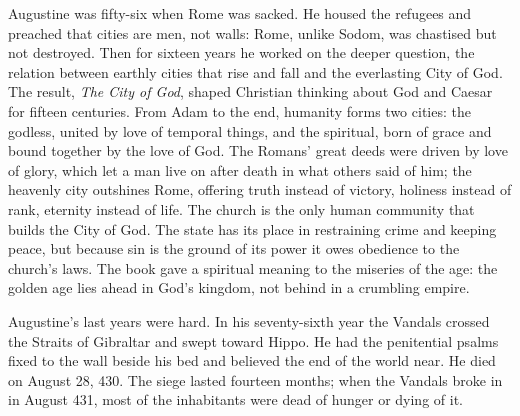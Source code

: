 Augustine was fifty-six when Rome was sacked. He housed the refugees and preached that cities are men,
not walls: Rome, unlike Sodom, was chastised but not destroyed. Then for sixteen years he worked on
the deeper question, the relation between earthly cities that rise and fall and the everlasting City
of God. The result, \emph{The City of God}, shaped Christian thinking about God and Caesar for fifteen
centuries. From Adam to the end, humanity forms two cities: the godless, united by love of temporal
things, and the spiritual, born of grace and bound together by the love of God. The Romans' great
deeds were driven by love of glory, which let a man live on after death in what others said of him; the heavenly city
outshines Rome, offering truth instead of victory, holiness instead of rank, eternity instead of life.
The church is the only human community that builds the City of God. The state has its place in
restraining crime and keeping peace, but because sin is the ground of its power it owes obedience to the church's laws. The book gave a spiritual meaning to the miseries of the age: the golden age lies ahead
in God's kingdom, not behind in a crumbling empire.

Augustine's last years were hard. In his seventy-sixth year the Vandals crossed the Straits of Gibraltar and swept
toward Hippo. He had the penitential psalms fixed to the wall beside his bed and believed the end of
the world near. He died on August 28, 430. The siege lasted fourteen months; when the Vandals broke in
in August 431, most of the inhabitants were dead of hunger or dying of it.

\begin{keyfacts}
\end{keyfacts}

